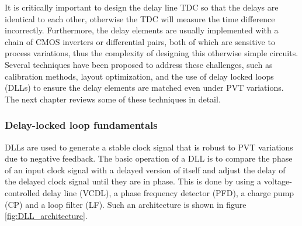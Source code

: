 It is critically important to design the delay line TDC so that the delays are identical to each other, otherwise the TDC will measure the time difference incorrectly. Furthermore, the
delay elements are usually implemented with a chain of CMOS inverters or differential pairs, both of which are sensitive to process variations, thus the complexity of designing this
otherwise simple circuits. Several techniques have been proposed to address these challenges, such as calibration methods, layout optimization, and the use of delay locked loops (DLLs) to
ensure the delay elements are matched even under PVT variations. The next chapter reviews some of these techniques in detail.

\subsubsection{Delay-locked loop fundamentals}

DLLs are used to generate a stable clock signal that is robust to PVT variations due to negative feedback. The basic operation of a DLL is to compare the phase of an input clock 
signal with a delayed version of itself and adjust the delay of the delayed clock signal until they are in phase. This is done by using a voltage-controlled delay line (VCDL), a phase 
frequency detector (PFD), a charge pump (CP) and a loop filter (LF). Such an architecture is shown in figure \ref{fig:DLL_architecture}.

